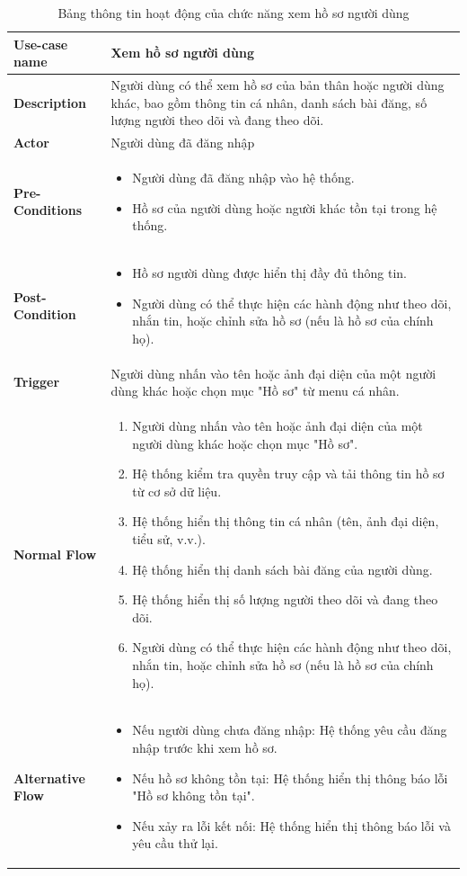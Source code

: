 \begin{longtable}{|>{\bfseries}m{4cm}|m{10cm}|}
    \caption{Bảng thông tin hoạt động của chức năng xem hồ sơ người dùng}
    \label{table:usecase-profile}\\
    
\hline
Use-case name & Xem hồ sơ người dùng \\
\hline
Description & Người dùng có thể xem hồ sơ của bản thân hoặc người dùng khác, bao gồm thông tin cá nhân, danh sách bài đăng, số lượng người theo dõi và đang theo dõi. \\
\hline
Actor & Người dùng đã đăng nhập \\
\hline
Pre-Conditions & 
\begin{itemize}
    \item Người dùng đã đăng nhập vào hệ thống.
    \item Hồ sơ của người dùng hoặc người khác tồn tại trong hệ thống.
\end{itemize} \\
\hline
Post-Condition & 
\begin{itemize}
    \item Hồ sơ người dùng được hiển thị đầy đủ thông tin.
    \item Người dùng có thể thực hiện các hành động như theo dõi, nhắn tin, hoặc chỉnh sửa hồ sơ (nếu là hồ sơ của chính họ).
\end{itemize} \\
\hline
Trigger & Người dùng nhấn vào tên hoặc ảnh đại diện của một người dùng khác hoặc chọn mục "Hồ sơ" từ menu cá nhân. \\
\hline
Normal Flow &
\begin{enumerate}
    \item Người dùng nhấn vào tên hoặc ảnh đại diện của một người dùng khác hoặc chọn mục "Hồ sơ".
    \item Hệ thống kiểm tra quyền truy cập và tải thông tin hồ sơ từ cơ sở dữ liệu.
    \item Hệ thống hiển thị thông tin cá nhân (tên, ảnh đại diện, tiểu sử, v.v.).
    \item Hệ thống hiển thị danh sách bài đăng của người dùng.
    \item Hệ thống hiển thị số lượng người theo dõi và đang theo dõi.
    \item Người dùng có thể thực hiện các hành động như theo dõi, nhắn tin, hoặc chỉnh sửa hồ sơ (nếu là hồ sơ của chính họ).
\end{enumerate} \\
\hline
Alternative Flow & 
\begin{itemize}
    \item Nếu người dùng chưa đăng nhập: Hệ thống yêu cầu đăng nhập trước khi xem hồ sơ.
    \item Nếu hồ sơ không tồn tại: Hệ thống hiển thị thông báo lỗi "Hồ sơ không tồn tại".
    \item Nếu xảy ra lỗi kết nối: Hệ thống hiển thị thông báo lỗi và yêu cầu thử lại.
\end{itemize} \\
\hline
\end{longtable}


